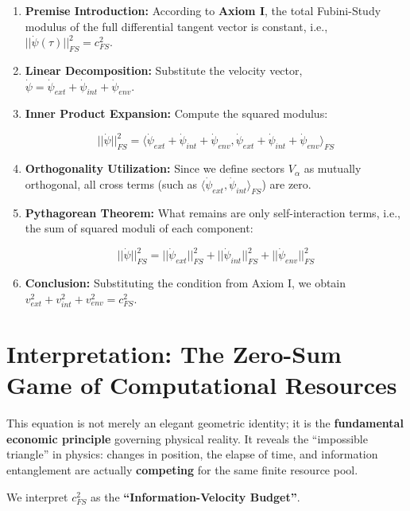 \documentclass[11pt,a4paper,twoside]{book}
\begin{document}
\begin{enumerate}
\item \textbf{Premise Introduction:} According to \textbf{Axiom I}, the total Fubini-Study modulus of the full differential tangent vector is constant, i.e., \textbf{$||\dot{\psi}(\tau)||_{FS}^2 = c_{FS}^2$}.

\item \textbf{Linear Decomposition:} Substitute the velocity vector, \textbf{$\dot{\psi} = \dot{\psi}_{ext} + \dot{\psi}_{int} + \dot{\psi}_{env}$}.

\item \textbf{Inner Product Expansion:} Compute the squared modulus:

   $$||\dot{\psi}||_{FS}^2 = \langle \dot{\psi}_{ext} + \dot{\psi}_{int} + \dot{\psi}_{env}, \dot{\psi}_{ext} + \dot{\psi}_{int} + \dot{\psi}_{env} \rangle_{FS}$$

\item \textbf{Orthogonality Utilization:} Since we define sectors \textbf{$V_{\alpha}$} as mutually orthogonal, all cross terms (such as \textbf{$\langle \dot{\psi}_{ext}, \dot{\psi}_{int} \rangle_{FS}$}) are zero.

\item \textbf{Pythagorean Theorem:} What remains are only self-interaction terms, i.e., the sum of squared moduli of each component:

   $$||\dot{\psi}||_{FS}^2 = ||\dot{\psi}_{ext}||_{FS}^2 + ||\dot{\psi}_{int}||_{FS}^2 + ||\dot{\psi}_{env}||_{FS}^2$$

\item \textbf{Conclusion:} Substituting the condition from Axiom I, we obtain \textbf{$v_{ext}^2 + v_{int}^2 + v_{env}^2 = c_{FS}^2$}.
\end{enumerate}

\section{Interpretation: The Zero-Sum Game of Computational Resources}

This equation is not merely an elegant geometric identity; it is the \textbf{fundamental economic principle} governing physical reality. It reveals the ``impossible triangle'' in physics: changes in position, the elapse of time, and information entanglement are actually \textbf{competing} for the same finite resource pool.

We interpret \textbf{$c_{FS}^2$} as the \textbf{``Information-Velocity Budget''}.
\end{document}
